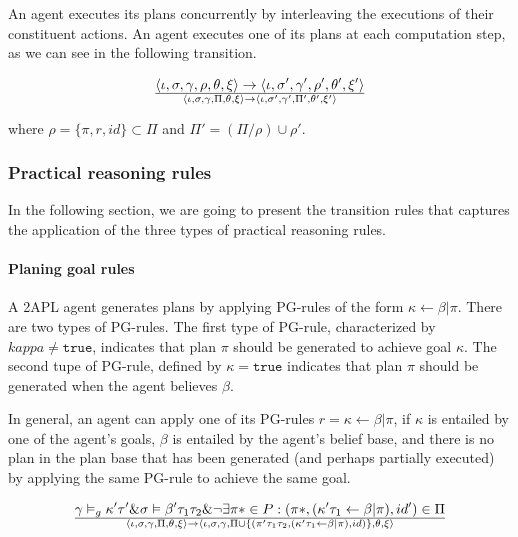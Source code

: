 \documentclass[a4paper]{article}
\begin{document}
An agent executes its plans concurrently by interleaving the executions of their constituent actions. An agent executes one of its plans at each computation step, as we can see in the following transition.

$$ {\langle \iota, \sigma, \gamma, \rho, \theta, \xi \rangle \rightarrow \langle \iota, \sigma', \gamma', \rho', \theta', \xi' \rangle } \over {\langle \iota, \sigma, \gamma, \Pi, \theta, \xi \rangle \rightarrow \langle \iota, \sigma', \gamma', \Pi', \theta', \xi' \rangle}$$

where $\rho = \{\pi, r, id\} \subset \Pi $ and $\Pi' = (\Pi/\rho) \cup \rho'$.

\subsubsection{Practical reasoning rules}

In the following section, we are going to present the transition rules that captures the application of the three types of practical reasoning rules.

\paragraph{Planing goal rules}

A 2APL agent generates plans by applying PG-rules of the form $\kappa \leftarrow \beta \vert \pi$. There are two types of PG-rules. The first type of PG-rule, characterized by $kappa \neq \texttt{true}$, indicates that plan $\pi$ should be generated to achieve goal $\kappa$. The second tupe of PG-rule, defined by $\kappa = \texttt{true}$ indicates that plan $\pi$ should be generated when the agent believes $\beta$.

In general, an agent can apply one of its PG-rules $ r = \kappa \leftarrow \beta \vert \pi $, if $\kappa$ is entailed by one of the agent's goals, $\beta$ is entailed by the agent's belief base, and there is no plan in the plan base that has been generated (and perhaps partially executed) by applying the same PG-rule to achieve the same goal.

$$ {\gamma \vDash_{g} \kappa'\tau' \& \sigma \vDash \beta'\tau_{1}\tau_{2} \& \neg\exists\pi * \in P : (\pi *, (\kappa'\tau_{1} \leftarrow \beta \vert \pi), id') \in \Pi} \over {\langle \iota, \sigma, \gamma, \Pi, \theta, \xi \rangle \rightarrow \langle \iota, \sigma, \gamma, \Pi \cup \{(\pi'\tau_{1}\tau_{2}, (\kappa'\tau_{1} \leftarrow \beta \vert \pi), id) \}, \theta, \xi \rangle} $$
\end{document}
